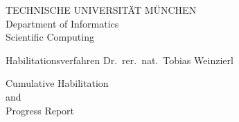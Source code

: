 
\begin{titlepage}

{ \large
  \begin{center}

  TECHNISCHE UNIVERSIT\"AT M\"UNCHEN \\
  \vspace{.3cm} 
  Department of Informatics \\
  Scientific Computing

  \vspace{4cm}
   Habilitationsverfahren Dr.~rer.~nat.~Tobias Weinzierl
  
  \vspace{1.5cm}

{\Huge
Cumulative Habilitation
}
\\
\vspace{1cm}
and 
\\
\vspace{0.6cm}
{\Huge
Progress Report\\
}

  \vspace{1.5cm}

  \end{center}
}


\end{titlepage}
